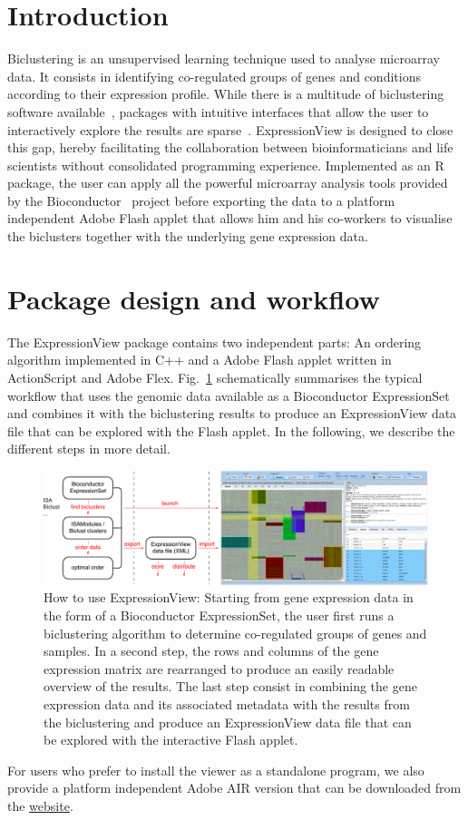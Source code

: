 \documentclass[round]{bioinfo}
\begin{document}
\section{Introduction}
Biclustering is an unsupervised learning technique used to analyse microarray data. It consists in identifying co-regulated groups of genes and conditions according to their expression profile. While there is a multitude of biclustering software available~\citep{madeira04}, packages with intuitive interfaces that allow the user to interactively explore the results are sparse~\citep{santamaria08}. ExpressionView is designed to close this gap, hereby facilitating the collaboration between bioinformaticians and life scientists without consolidated programming experience. Implemented as an R package, the user can apply all the powerful microarray analysis tools provided by the Bioconductor~\citep{gentleman04} project before exporting the data to a platform independent Adobe Flash applet that allows him and his co-workers to visualise the biclusters together with the underlying gene expression data.

\section{Package design and workflow}
The ExpressionView package contains two independent parts: An ordering algorithm implemented in C++ and a Adobe Flash applet written in ActionScript and Adobe Flex. Fig.~\ref{fig:workflow} schematically summarises the typical workflow that uses the genomic data available as a Bioconductor ExpressionSet and combines it with the biclustering results to produce an ExpressionView data file that can be explored with the Flash applet. In the following, we describe the different steps in more detail.
\begin{figure}[!tpb]
\centerline{\includegraphics[width=0.9\linewidth]{fig1-crop}}
\caption{How to use ExpressionView: Starting from gene expression data in the form of a Bioconductor ExpressionSet, the user first runs a biclustering algorithm to determine co-regulated groups of genes and samples. In a second step, the rows and columns of the gene expression matrix are rearranged to produce an easily readable overview of the results. The last step consist in combining the gene expression data and its associated metadata with the results from the biclustering and produce an ExpressionView data file that can be explored with the interactive Flash applet.}\label{fig:workflow}
\end{figure}
For users who prefer to install the viewer as a standalone program, we also provide a platform independent Adobe AIR version that can be downloaded from the \href{http://www2.unil.ch/cbg/index.php?title=ExpressionView}{website}.
\end{document}
